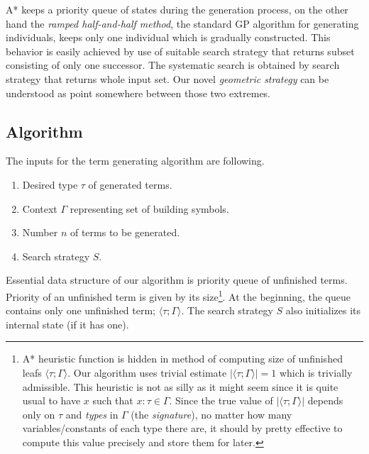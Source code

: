 \documentclass[conference]{IEEEtran}
\newcommand{\ul}[2]{\langle #1 ; #2 \rangle}
\begin{document}
A* keeps a priority queue of states during the generation process,
on the other hand the \textit{ramped half-and-half method}, 
the standard GP algorithm for generating individuals, 
keeps only one individual which is gradually constructed. This 
behavior is easily achieved by use of suitable search strategy 
that returns subset consisting of only one successor.
The systematic search is obtained by search strategy that 
returns whole input set.      
Our novel \textit{geometric strategy} can be understood as
point somewhere between those two extremes.

\subsection{Algorithm}

The inputs for the term generating algorithm are following.
\begin{enumerate}
 \item Desired type $\tau$ of generated terms.
 \item Context $\Gamma$ representing set of building symbols.
 \item Number $n$ of terms to be generated.
 \item Search strategy $S$. 
\end{enumerate}

Essential data structure of our algorithm 
is priority queue of unfinished terms. 
Priority of an unfinished term is given by its size\footnote{
A* heuristic function is hidden in method of computing
size of unfinished leafs $\ul{\tau}{\Gamma}$. Our algorithm uses
trivial estimate $\vert\ul{\tau}{\Gamma}\vert = 1$ which is trivially admissible.
This heuristic is not as silly as it might seem since it is
quite usual to have $x$ such that $x : \tau \in \Gamma$.
Since the true value of $\vert\ul{\tau}{\Gamma}\vert$ depends only on
$\tau$ and \textit{types} in $\Gamma$ (the \textit{signature}), 
no matter how many variables/constants of
each type there are, it should by pretty effective to compute this
value precisely and store them for later. 
}.
At the beginning, the queue contains only one unfinished term; 
$\ul{\tau}{\Gamma}$. The search strategy $S$ also 
initializes its internal state (if it has one).
\end{document}
